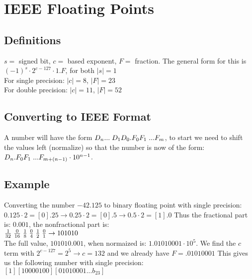 \section{IEEE Floating Points}
\subsection*{Definitions}
$s = $ signed bit, $c =$ based exponent, $F =$ fraction. The general form
for this is $(-1)^s \cdot 2^{c - 127} \cdot 1.F$, for both $|s| = 1$\\
For single precision: $|c| = 8$, $|F| = 23$\\
For double precision: $|c| = 11$, $|F| = 52$\\

\subsection*{Converting to IEEE Format}
A number will have the form $D_n ... \hspace{1mm} D_1 D_0 . F_0 F_1 \hspace{1mm} ... F_m$,
to start we need to shift the values left (normalize) so that the number is now
of the form: $D_n . F_0 F_1 \hspace{1mm} ... F_{m + (n-1)} \cdot 10^{n-1}$.

\subsection*{Example}
Converting the number $-42.125$ to binary floating point with single precision:\\
$0.125 \cdot 2 = [0].25 \rightarrow 0.25 \cdot 2 = [0].5 \rightarrow 0.5 \cdot 2 = [1].0$
Thus the fractional part is: $0.001$, the nonfractional part is:\\
$\frac{1}{32} \hspace{1mm} \frac{0}{16} \hspace{1mm} \frac{1}{8} \hspace{1mm} \frac{0}{4} \hspace{1mm} \frac{1}{2} \hspace{1mm} \frac{0}{1} \rightarrow 101010$\\
The full value, $101010.001$, when normaized is: $1.01010001 \cdot 10^5$. We find the $c$
term with $2^{c - 127} = 2^5 \rightarrow c = 132$ and we already have $F = .01010001$
This gives us the following number with single precision:\\
$[1][10000100][01010001 ... b_{23}]$\\
